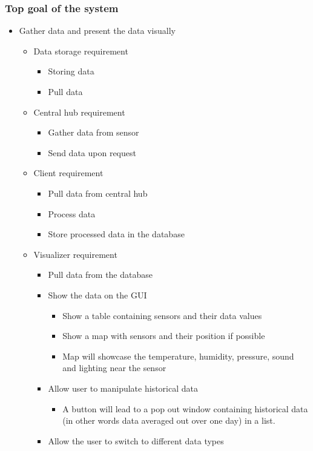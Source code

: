 \documentclass[../document]{subfiles}
\begin{document}
\subsubsection{Top goal of the system}
\begin{itemize}
	\item
	Gather data and present the data visually
	\begin{itemize}
		\item
		Data storage requirement
		\begin{itemize}
			\item
			Storing data
			\item
			Pull data
		\end{itemize}
		\item
		Central hub requirement
		\begin{itemize}
			\item
			Gather data from sensor
			\item
			Send data upon request
		\end{itemize}
		\item
		Client requirement
		\begin{itemize}
			\item
			Pull data from central hub
			\item
			Process data
			\item
			Store processed data in the database
		\end{itemize}
		\item
		Visualizer requirement
		\begin{itemize}
			\item
			Pull data from the database
			\item
			Show the data on the GUI
			\begin{itemize}
				\item
				Show a table containing sensors and their data values
				\item
				Show a map with sensors and their position if possible
				\item
				Map will showcase the temperature, humidity, pressure, sound and lighting near the sensor
			\end{itemize}
			\item
			Allow user to manipulate historical data
			\begin{itemize}
				\item
				A button will lead to a pop out window containing historical data (in other words data averaged out over one day) in a list.
			\end{itemize}
			\item
			Allow the user to switch to different data types
		\end{itemize}
	\end{itemize}
\end{itemize}
\end{document}
